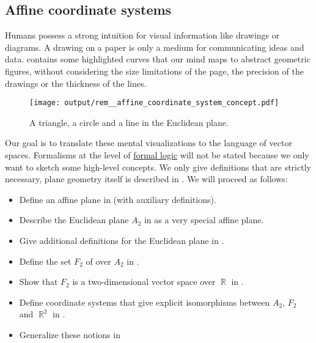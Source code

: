 \subsection{Affine coordinate systems}\label{subsec:affine_coordinate_system}

\begin{remark}\label{rem:affine_coordinate_system_concept}
  Humans possess a strong intuition for visual information like drawings or diagrams. A drawing on a paper is only a medium for communicating ideas and data.  contains some highlighted curves that our mind maps to abstract geometric figures, without considering the size limitations of the page, the precision of the drawings or the thickness of the lines.

  \begin{figure}[!ht]
    \centering
    \texttt{[image: output/rem\_\_affine\_coordinate\_system\_concept.pdf]}
    \caption{A triangle, a circle and a line in the Euclidean plane.}\label{def:euclidean_plane/figures}
  \end{figure}

  Our goal is to translate these mental visualizations to the language of vector spaces. Formalisms at the level of \hyperref[sec:mathematical_logic]{formal logic} will not be stated because we only want to sketch some high-level concepts. We only give definitions that are strictly necessary, plane geometry itself is described in . We will proceed as follows:

  \begin{itemize}
    \item Define an affine plane in  (with auxiliary definitions).
    \item Describe the Euclidean plane \( A_2 \) in  as a very special affine plane.
    \item Give additional definitions for the Euclidean plane in .
    \item Define the set \( F_2 \) of  over \( A_2 \) in .
    \item Show that \( F_2 \) is a two-dimensional vector space over \( \BbbR \) in .
    \item Define coordinate systems that give explicit isomorphisms between \( A_2 \), \( F_2 \) and \( \BbbR^2 \) in .
    \item Generalize these notions in 
  \end{itemize}
\end{remark}

